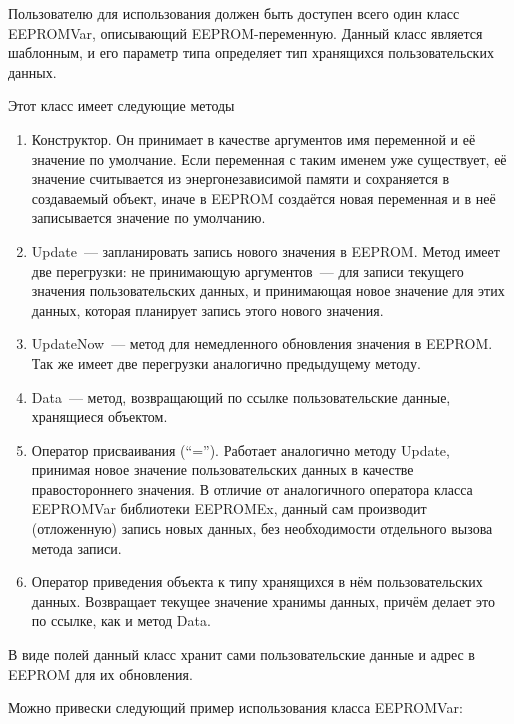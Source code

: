 Пользователю для использования должен быть доступен всего один класс EEPROMVar, описывающий EEPROM-переменную.
Данный класс является шаблонным, и его параметр типа определяет тип хранящихся пользовательских данных.

Этот класс имеет следующие методы
\begin{enumerate}
	\item Конструктор. Он принимает в качестве аргументов имя переменной и её значение по умолчание.
	Если переменная с таким именем уже существует, её значение считывается из энергонезависимой памяти и сохраняется в создаваемый объект, иначе в EEPROM создаётся новая переменная и в неё записывается значение по умолчанию.
	\item Update~--- запланировать запись нового значения в EEPROM.
	Метод имеет две перегрузки: не принимающую аргументов~--- для записи текущего значения пользовательских данных, и принимающая новое значение для этих данных, которая планирует запись этого нового значения.
	\item UpdateNow~--- метод для немедленного обновления значения в EEPROM.
	Так же имеет две перегрузки аналогично предыдущему методу.
	\item Data~--- метод, возвращающий по ссылке пользовательские данные, хранящиеся объектом.
	\item Оператор присваивания ("`="').
	Работает аналогично методу Update, принимая новое значение пользовательских данных в качестве правостороннего значения.
	В отличие от аналогичного оператора класса EEPROMVar библиотеки EEPROMEx, данный сам производит (отложенную) запись новых данных, без необходимости отдельного вызова метода записи.
	\item Оператор приведения объекта к типу хранящихся в нём пользовательских данных.
	Возвращает текущее значение хранимы данных, причём делает это по ссылке, как и метод Data.
\end{enumerate}

В виде полей данный класс хранит сами пользовательские данные и адрес в EEPROM для их обновления.

Можно привески следующий пример использования класса EEPROMVar:



